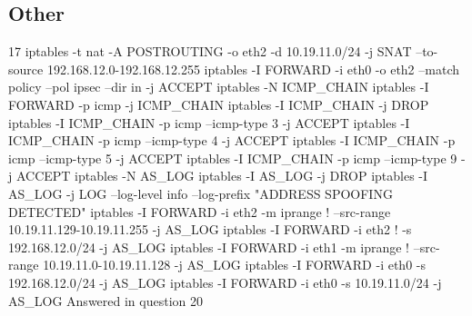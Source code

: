 \documentclass[12pt]{article}
\begin{document}
\subsection*{Other}
17\newline
iptables -t nat -A POSTROUTING -o eth2 -d 10.19.11.0/24 -j SNAT --to-source 192.168.12.0-192.168.12.255\newline
{}\newline
iptables -I FORWARD -i eth0 -o eth2 --match policy --pol ipsec --dir in -j ACCEPT\newline
{}\newline
iptables -N ICMP\_CHAIN\newline
iptables -I FORWARD -p icmp -j ICMP\_CHAIN\newline
iptables -I ICMP\_CHAIN -j DROP\newline
iptables -I ICMP\_CHAIN -p icmp --icmp-type 3 -j ACCEPT\newline
iptables -I ICMP\_CHAIN -p icmp --icmp-type 4 -j ACCEPT\newline
iptables -I ICMP\_CHAIN -p icmp --icmp-type 5 -j ACCEPT\newline
iptables -I ICMP\_CHAIN -p icmp --icmp-type 9 -j ACCEPT\newline
{}\newline
iptables -N AS\_LOG\newline
iptables -I AS\_LOG -j DROP\newline
iptables -I AS\_LOG -j LOG --log-level info --log-prefix "ADDRESS SPOOFING DETECTED"\newline
iptables -I FORWARD -i eth2 -m iprange ! --src-range 10.19.11.129-10.19.11.255 -j AS\_LOG\newline
iptables -I FORWARD -i eth2 ! -s 192.168.12.0/24 -j AS\_LOG\newline
{}\newline
iptables -I FORWARD -i eth1 -m iprange ! --src-range 10.19.11.0-10.19.11.128 -j AS\_LOG\newline
{}\newline
iptables -I FORWARD -i eth0 -s 192.168.12.0/24 -j AS\_LOG\newline
iptables -I FORWARD -i eth0 -s 10.19.11.0/24 -j AS\_LOG\newline
{}\newline
Answered in question 20\newline
\newline
\end{document}
